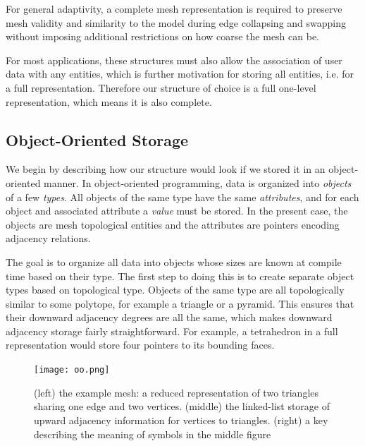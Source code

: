 For general adaptivity,
a complete mesh representation is required to preserve mesh
validity and similarity to the model during edge
collapsing and swapping without imposing additional
restrictions on how coarse the mesh can be.

For most applications, these structures
must also allow the association of user data with any
entities, which is further motivation for storing
all entities, i.e. for a full representation.
Therefore our structure of choice is a full
one-level representation, which means it is also complete.

\subsection{Object-Oriented Storage}
\label{sec:sisc_oo}

We begin by describing how our structure would look
if we stored it in an object-oriented manner.
In object-oriented programming, data is organized
into {\it objects} of a few {\it types}.
All objects of the same type have the same {\it attributes},
and for each object and associated attribute a {\it value} must be stored.
In the present case, the objects are mesh topological entities
and the attributes are pointers encoding adjacency relations.

The goal is to organize all data into objects whose
sizes are known at compile time based on their type.
The first step to doing this is to create separate object types
based on topological type.
Objects of the same type are all topologically similar to some polytope,
for example a triangle or a pyramid.
This ensures that their downward adjacency degrees are all the same,
which makes downward adjacency storage fairly straightforward.
For example, a tetrahedron in a full representation would store
four pointers to its bounding faces.

\begin{figure}
\begin{center}
\texttt{[image: oo.png]}
\caption{(left) the example mesh: a reduced representation of two
triangles sharing one edge and two vertices.
(middle) the linked-list storage of upward adjacency information
for vertices to triangles.
(right) a key describing the meaning of symbols in the middle figure}
\label{fig:oo}
\end{center}
\end{figure}

